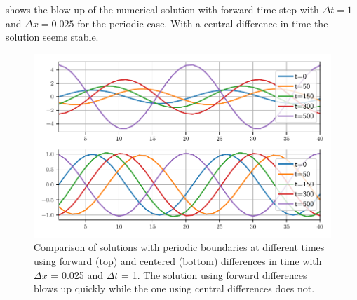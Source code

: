 \begin{appendices}

 shows the blow up of the numerical solution with forward
time step with $\Delta t = 1$ and $\Delta x = 0.025$ for the periodic case.
With a central difference in time the solution seems stable.

\begin{figure}[h]
  \centering
  \includegraphics[width=\textwidth]{../figures/compare_dt_1.pdf}
  \caption{Comparison of solutions with periodic boundaries
  at different times using forward (top) and
  centered (bottom) differences in time with $\Delta x$ = 0.025 and $\Delta t$
  = 1. The solution using forward differences
  blows up quickly while the one using central differences does not.}
  \label{fig:compare}
\end{figure}

\end{appendices}
